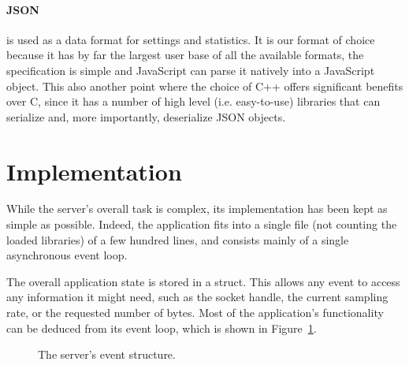 \paragraph{JSON} is used  as a data format for settings  and statistics. It is
our format of  choice because it has by  far the largest user base  of all the
available formats,  the specification  is simple and  JavaScript can  parse it
natively into a JavaScript object. This also another point where the choice of
C++ offers significant  benefits over C, since  it has a number  of high level
(i.e.  easy-to-use)  libraries  that  can  serialize  and,  more  importantly,
deserialize JSON objects.

%
%
\section{Implementation} %
\label{sec:server:implementation}

While the server's  overall task is complex, its implementation  has been kept
as simple  as possible. Indeed, the application  fits into a single  file (not
counting the loaded libraries) of a  few hundred lines, and consists mainly of
a single asynchronous event loop.

The overall application state is stored  in a struct. This allows any event to
access any information  it might need, such as the  socket handle, the current
sampling rate,  or the requested number  of bytes.  Most of  the application's
functionality  can  be  deduced  from  its  event  loop,  which  is  shown  in
Figure~\ref{fig:server:eventstructure}.

\begin{figure}
    \centering
    
    \caption[Server Event Structure]{%
        The server's event structure.%
    }
    \label{fig:server:eventstructure}
\end{figure}

